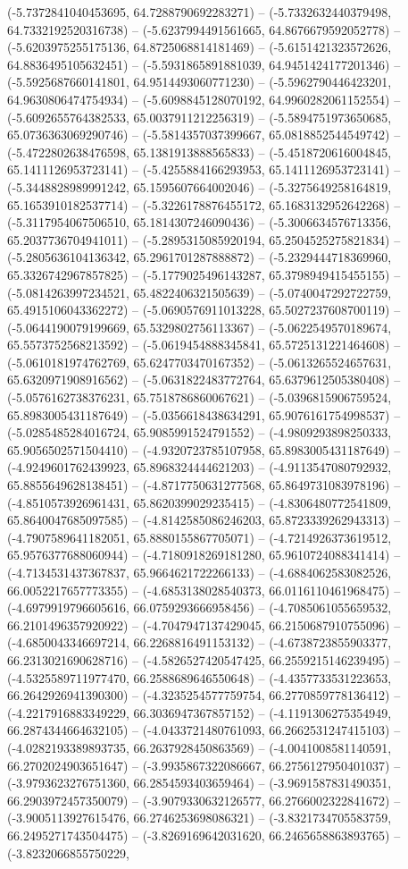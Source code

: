 (-5.7372841040453695, 64.7288790692283271) -- (-5.7332632440379498, 64.7332192520316738) -- (-5.6237994491561665, 64.8676679592052778) -- (-5.6203975255175136, 64.8725068814181469) -- (-5.6151421323572626, 64.8836495105632451) -- (-5.5931865891881039, 64.9451424177201346) -- (-5.5925687660141801, 64.9514493060771230) -- (-5.5962790446423201, 64.9630806474754934) -- (-5.6098845128070192, 64.9960282061152554) -- (-5.6092655764382533, 65.0037911212256319) -- (-5.5894751973650685, 65.0736363069290746) -- (-5.5814357037399667, 65.0818852544549742) -- (-5.4722802638476598, 65.1381913888565833) -- (-5.4518720616004845, 65.1411126953723141) -- (-5.4255884166293953, 65.1411126953723141) -- (-5.3448828989991242, 65.1595607664002046) -- (-5.3275649258164819, 65.1653910182537714) -- (-5.3226178876455172, 65.1683132952642268) -- (-5.3117954067506510, 65.1814307246090436) -- (-5.3006634576713356, 65.2037736704941011) -- (-5.2895315085920194, 65.2504525275821834) -- (-5.2805636104136342, 65.2961701287888872) -- (-5.2329444718369960, 65.3326742967857825) -- (-5.1779025496143287, 65.3798949415455155) -- (-5.0814263997234521, 65.4822406321505639) -- (-5.0740047292722759, 65.4915106043362272) -- (-5.0690576911013228, 65.5027237608700119) -- (-5.0644190079199669, 65.5329802756113367) -- (-5.0622549570189674, 65.5573752568213592) -- (-5.0619454888345841, 65.5725131221464608) -- (-5.0610181974762769, 65.6247703470167352) -- (-5.0613265524657631, 65.6320971908916562) -- (-5.0631822483772764, 65.6379612505380408) -- (-5.0576162738376231, 65.7518786860067621) -- (-5.0396815906759524, 65.8983005431187649) -- (-5.0356618438634291, 65.9076161754998537) -- (-5.0285485284016724, 65.9085991524791552) -- (-4.9809293898250333, 65.9056502571504410) -- (-4.9320723785107958, 65.8983005431187649) -- (-4.9249601762439923, 65.8968324444621203) -- (-4.9113547080792932, 65.8855649628138451) -- (-4.8717750631277568, 65.8649731083978196) -- (-4.8510573926961431, 65.8620399029235415) -- (-4.8306480772541809, 65.8640047685097585) -- (-4.8142585086246203, 65.8723339262943313) -- (-4.7907589641182051, 65.8880155867705071) -- (-4.7214926373619512, 65.9576377688060944) -- (-4.7180918269181280, 65.9610724088341414) -- (-4.7134531437367837, 65.9664621722266133) -- (-4.6884062583082526, 66.0052217657773355) -- (-4.6853138028540373, 66.0116110461968475) -- (-4.6979919796605616, 66.0759293666958456) -- (-4.7085061055659532, 66.2101496357920922) -- (-4.7047947137429045, 66.2150687910755096) -- (-4.6850043346697214, 66.2268816491153132) -- (-4.6738723855903377, 66.2313021690628716) -- (-4.5826527420547425, 66.2559215146239495) -- (-4.5325589711977470, 66.2588689646550648) -- (-4.4357733531223653, 66.2642926941390300) -- (-4.3235254577759754, 66.2770859778136412) -- (-4.2217916883349229, 66.3036947367857152) -- (-4.1191306275354949, 66.2874344664632105) -- (-4.0433721480761093, 66.2662531247415103) -- (-4.0282193389893735, 66.2637928450863569) -- (-4.0041008581140591, 66.2702024903651647) -- (-3.9935867322086667, 66.2756127950401037) -- (-3.9793623276751360, 66.2854593403659464) -- (-3.9691587831490351, 66.2903972457350079) -- (-3.9079330632126577, 66.2766002322841672) -- (-3.9005113927615476, 66.2746253698086321) -- (-3.8321734705583759, 66.2495271743504475) -- (-3.8269169642031620, 66.2465658863893765) -- (-3.8232066855750229, 